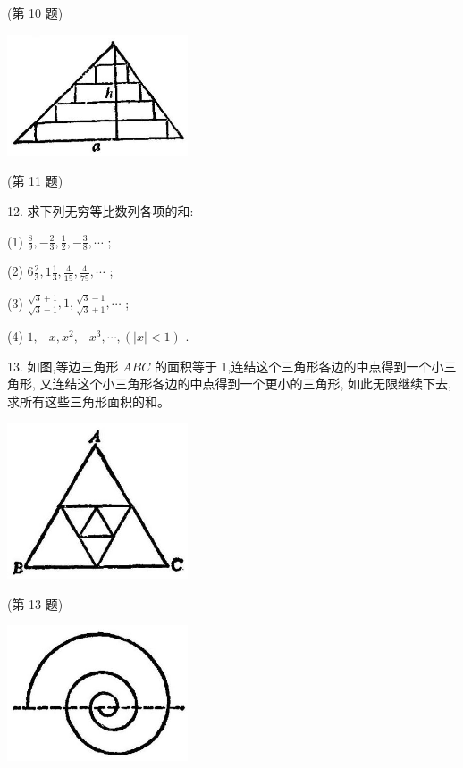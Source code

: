 \documentclass[10pt]{article}
\begin{document}
(第 10 题)

\begin{center}
\includegraphics[max width=0.4\textwidth]{images/01912c18-5c3f-733d-b775-749ba9897a9d_20_862371.jpg}
\end{center}

(第 11 题)

12. 求下列无穷等比数列各项的和:

(1) \(\frac{8}{9}, - \frac{2}{3},\frac{1}{2}, - \frac{3}{8},\cdots\) ;

(2) \(6\frac{2}{3},1\frac{1}{3},\frac{4}{15},\frac{4}{75},\cdots\) ;

(3) \(\frac{\sqrt{3} + 1}{\sqrt{3} - 1},1,\frac{\sqrt{3} - 1}{\sqrt{3} + 1},\cdots\) ;

(4) \(1, - x,{x}^{2}, - {x}^{3},\cdots ,\left( {\left| x\right| < 1}\right)\) .

13. 如图,等边三角形 \({ABC}\) 的面积等于 1,连结这个三角形各边的中点得到一个小三角形, 又连结这个小三角形各边的中点得到一个更小的三角形, 如此无限继续下去, 求所有这些三角形面积的和。

\begin{center}
\includegraphics[max width=0.4\textwidth]{images/01912c18-5c3f-733d-b775-749ba9897a9d_20_529798.jpg}
\end{center}

(第 13 题)

\begin{center}
\includegraphics[max width=0.4\textwidth]{images/01912c18-5c3f-733d-b775-749ba9897a9d_20_500122.jpg}
\end{center}
\end{document}
